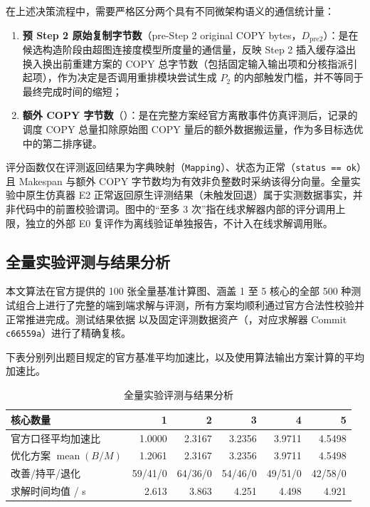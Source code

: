\documentclass[anonymous,notoc]{gmcm2026}
\providecommand{\tightlist}{\setlength{\itemsep}{0pt}\setlength{\parskip}{0pt}}
\begin{document}
在上述决策流程中，需要严格区分两个具有不同微架构语义的通信统计量：

\begin{enumerate}
\def\labelenumi{\arabic{enumi}.}
\tightlist
\item
  \textbf{预 Step 2 原始复制字节数}（pre-Step 2 original COPY bytes，\(D_{\mathrm{pre2}}\)）：是在候选构造阶段由超图连接度模型所度量的通信量，反映 Step 2 插入缓存溢出换入换出前重建方案的 COPY 总字节数（包括固定输入输出项和分核指派引起项），作为决定是否调用重排模块尝试生成 \(P_2\) 的内部触发门槛，并不等同于最终完成时间的缩短；
\item
  \textbf{额外 COPY 字节数}（\texttt{}）：是在完整方案经官方离散事件仿真评测后，记录的调度 COPY 总量扣除原始图 COPY 量后的额外数据搬运量，作为多目标选优中的第二排序键。
\end{enumerate}

评分函数仅在评测返回结果为字典映射（\texttt{Mapping}）、状态为正常（\texttt{status\ ==\ \textquotesingle{}ok\textquotesingle{}}）且 Makespan 与额外 COPY 字节数均为有效非负整数时采纳该得分向量。全量实验中原生仿真器 E2 正常返回原生评测结果（未触发回退）属于实测数据事实，并非代码中的前置校验谓词。图中的``至多 3 次''指在线求解器内部的评分调用上限，独立的外部 E0 复评作为离线验证单独报告，不计入在线求解调用账。

\subsection{全量实验评测与结果分析}

本文算法在官方提供的 100 张全量基准计算图、涵盖 1 至 5 核心的全部 500 种测试组合上进行了完整的端到端求解与评测，所有方案均顺利通过官方合法性校验并正常推进完成。测试结果依据 \texttt{} 以及固定评测数据资产（\texttt{}，对应求解器 Commit \texttt{c66559a}）进行了精确复核。

下表分别列出题目规定的官方基准平均加速比，以及使用算法输出方案计算的平均加速比。

\begin{table}[!htbp]\centering
\caption{全量实验评测与结果分析}\label{tab:05-p2-1}\small

\begin{tabularx}{\linewidth}{@{}Xrrrrr@{}}\toprule
核心数量 & 1 & 2 & 3 & 4 & 5 \\
\midrule
官方口径平均加速比 & 1.0000 & 2.3167 & 3.2356 & 3.9711 & 4.5498 \\
优化方案 $\operatorname{mean}(B/M)$ & 1.2061 & 2.3167 & 3.2356 & 3.9711 & 4.5498 \\
改善/持平/退化 & 59/41/0 & 64/36/0 & 54/46/0 & 49/51/0 & 42/58/0 \\
求解时间均值 / s & 2.613 & 3.863 & 4.251 & 4.498 & 4.921 \\
\bottomrule\end{tabularx}\end{table}
\end{document}
